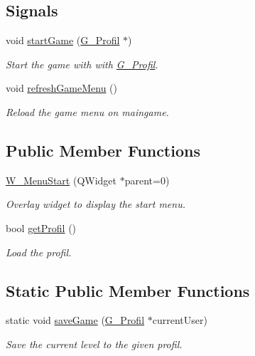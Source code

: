 \subsection*{Signals}
\begin{DoxyCompactItemize}
\item 
\hypertarget{class_w___menu_start_a21cf2c3cc2f360daa9d46f1b5c983461}{}void \hyperlink{class_w___menu_start_a21cf2c3cc2f360daa9d46f1b5c983461}{start\+Game} (\hyperlink{class_g___profil}{G\+\_\+\+Profil} $\ast$)\label{class_w___menu_start_a21cf2c3cc2f360daa9d46f1b5c983461}

\begin{DoxyCompactList}\small\item\em Start the game with with \hyperlink{class_g___profil}{G\+\_\+\+Profil}. \end{DoxyCompactList}\item 
\hypertarget{class_w___menu_start_a5e5f50ca83e56da21da0df7cc6bfd8f1}{}void \hyperlink{class_w___menu_start_a5e5f50ca83e56da21da0df7cc6bfd8f1}{refresh\+Game\+Menu} ()\label{class_w___menu_start_a5e5f50ca83e56da21da0df7cc6bfd8f1}

\begin{DoxyCompactList}\small\item\em Reload the game menu on maingame. \end{DoxyCompactList}\end{DoxyCompactItemize}
\subsection*{Public Member Functions}
\begin{DoxyCompactItemize}
\item 
\hyperlink{class_w___menu_start_a7f9c60df0d2a0fba30c37b99d2b7630e}{W\+\_\+\+Menu\+Start} (Q\+Widget $\ast$parent=0)
\begin{DoxyCompactList}\small\item\em Overlay widget to display the start menu. \end{DoxyCompactList}\item 
bool \hyperlink{class_w___menu_start_aa147cc302db6aa457fba0c75ab25e1b2}{get\+Profil} ()
\begin{DoxyCompactList}\small\item\em Load the profil. \end{DoxyCompactList}\end{DoxyCompactItemize}
\subsection*{Static Public Member Functions}
\begin{DoxyCompactItemize}
\item 
static void \hyperlink{class_w___menu_start_a87603ac8ad130f946bb152a98acc1a57}{save\+Game} (\hyperlink{class_g___profil}{G\+\_\+\+Profil} $\ast$current\+User)
\begin{DoxyCompactList}\small\item\em Save the current level to the given profil. \end{DoxyCompactList}\end{DoxyCompactItemize}
